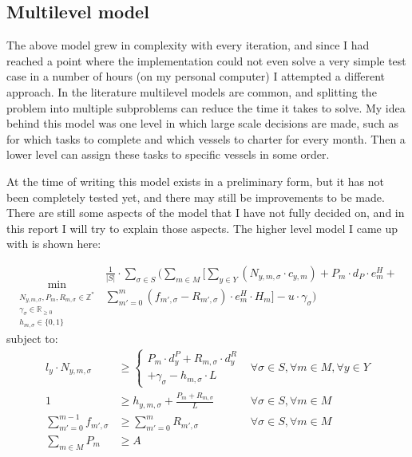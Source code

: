 \documentclass[a4paper,12pt]{article}
\begin{document}
\subsection{Multilevel model} \label{ss:multi}
The above model grew in complexity with every iteration, and since I had reached a point where the implementation could not even solve a very simple test case in a number of hours (on my personal computer) I attempted a different approach. In the literature multilevel models are common, and splitting the problem into multiple subproblems can reduce the time it takes to solve. My idea behind this model was one level in which large scale decisions are made, such as for which tasks to complete and which vessels to charter for every month. Then a lower level can assign these tasks to specific vessels in some order. 

At the time of writing this model exists in a preliminary form, but it has not been completely tested yet, and there may still be improvements to be made. There are still some aspects of the model that I have not fully decided on, and in this report I will try to explain those aspects. The higher level model I came up with is shown here:

\begin{equation}
	\min_{\substack{N_{y,m,\sigma}, P_m, R_{m,\sigma} \in \mathbb{Z}^* \\
	\gamma_\sigma \in \mathbb{R}_{\geq 0} \\
	h_{m,\sigma} \in \{0, 1\} }}
	\begin{aligned}
	\frac{1}{|S|} \cdot \sum_{\sigma \in S} ( \sum_{m \in M} [\sum_{y \in Y} 
	(N_{y,m,\sigma} \cdot c_{y,m}) +  
	P_m \cdot d_P \cdot e^H_m + \\
	\sum_{m' = 0}^{m} (f_{m',\sigma} - R_{m',\sigma}) \cdot e^H_m \cdot H_m ]
	- u \cdot \gamma_\sigma)
	\end{aligned}	
\end{equation}
subject to:
\begin{align}
l_y \cdot N_{y,m,\sigma} 			&\geq 	\begin{cases} P_m \cdot d^P_y + R_{m,\sigma} \cdot d^R_y \\
								+ \gamma_\sigma - h_{m,\sigma} \cdot L \end{cases}
																				& \forall \sigma \in S, \forall m \in M, \forall y \in Y 	\\
1 						&\geq		h_{y,m,\sigma} + \frac{P_m + R_{m,\sigma}}{L}					& \forall \sigma \in S, \forall m \in M 		 	\\
\sum_{m' = 0}^{m-1} f_{m',\sigma}	&\geq 	\sum_{m' = 0}^m R_{m',\sigma}								& \forall \sigma \in S, \forall m \in M			\\
\sum_{m\in M} P_m 			&\geq 	A 												&						
\end{align}
\end{document}
